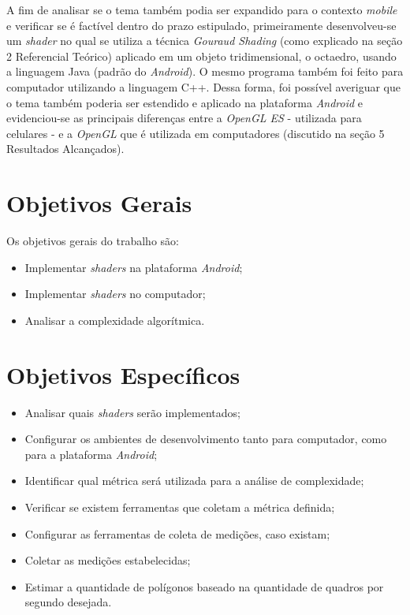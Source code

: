 A fim de analisar se o tema também podia ser expandido para o contexto \textit{mobile} e verificar se é factível dentro do prazo estipulado, primeiramente desenvolveu-se um \textit{shader} no qual se utiliza a técnica \textit{Gouraud Shading} (como explicado na seção 2 Referencial Teórico) aplicado em um objeto tridimensional, o octaedro, usando a linguagem Java (padrão do \textit{Android}). O mesmo programa também foi feito para computador utilizando a linguagem C++.  Dessa forma, foi possível averiguar que o tema também poderia ser estendido e aplicado na plataforma \textit{Android} e evidenciou-se as principais diferenças entre a \textit{OpenGL ES} - utilizada para celulares - e a \textit{OpenGL} que é utilizada em computadores (discutido na seção 5 Resultados Alcançados). 


\section{Objetivos Gerais}

Os objetivos gerais do trabalho são: 

\begin{itemize}
  \item Implementar \textit{shaders} na plataforma \textit{Android};
  \item  Implementar \textit{shaders} no computador;
   \item Analisar a complexidade algorítmica.
\end{itemize}


\section{Objetivos Específicos}

\begin{itemize}
  \item Analisar quais \textit{shaders} serão implementados;
  \item Configurar os ambientes de desenvolvimento tanto para computador, como para a plataforma \textit{Android};
  \item Identificar qual métrica será utilizada para a análise de complexidade;
\item Verificar se existem ferramentas que coletam a métrica definida;
\item Configurar as ferramentas de coleta de medições, caso existam; 
\item Coletar as medições estabelecidas;
\item  Estimar a quantidade de polígonos baseado na quantidade de quadros por segundo desejada.
\end{itemize}





